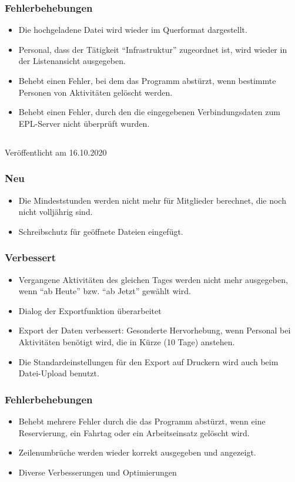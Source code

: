 \subsubsection{Fehlerbehebungen}
\begin{itemize}
  \item
  Die hochgeladene Datei wird wieder im Querformat dargestellt.
  \item
  Personal, dass der Tätigkeit "`Infrastruktur"' zugeordnet ist, wird wieder in der Listenansicht ausgegeben.
  \item
  Behebt einen Fehler, bei dem das Programm abstürzt, wenn bestimmte Personen von Aktivitäten gelöscht werden.
  \item
  Behebt einen Fehler, durch den die eingegebenen Verbindungsdaten zum EPL-Server nicht überprüft wurden.
\end{itemize}


\subsection{}
\label{version:1:6:2}
Veröffentlicht am 16.10.2020
\subsubsection{Neu}
\begin{itemize}
  \item Die Mindeststunden werden nicht mehr für Mitglieder berechnet, die noch nicht volljährig sind.
  \item Schreibschutz für geöffnete Dateien eingefügt.
\end{itemize}

\subsubsection{Verbessert}
\begin{itemize}
  \item Vergangene Aktivitäten des gleichen Tages werden nicht mehr ausgegeben, wenn "`ab Heute"' bzw. "`ab Jetzt"' gewählt wird.
  \item Dialog der Exportfunktion überarbeitet
  \item Export der Daten verbessert: Gesonderte Hervorhebung, wenn Personal bei Aktivitäten benötigt wird, die in Kürze (10 Tage) anstehen.
  \item Die Standardeinstellungen für den Export auf Druckern wird auch beim Datei-Upload benutzt.
\end{itemize}

\subsubsection{Fehlerbehebungen}
\begin{itemize}
  \item Behebt mehrere Fehler durch die das Programm abstürzt, wenn eine Reservierung, ein Fahrtag oder ein Arbeitseinsatz gelöscht wird.
  \item Zeilenumbrüche werden wieder korrekt ausgegeben und angezeigt.
  \item Diverse Verbesserungen und Optimierungen
\end{itemize}
